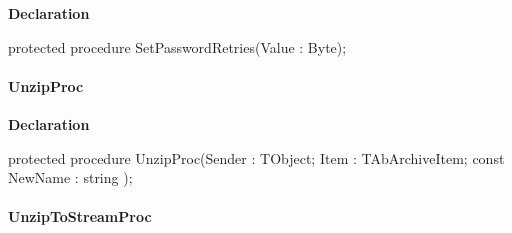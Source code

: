 \documentclass{report}
\newif\ifpdf
\begin{document}
\label{AbUnzper.TAbCustomUnZipper-SetPasswordRetries}
\begin{list}{}{
\setlength{\itemindent}{0cm}
\setlength{\listparindent}{0cm}
\setlength{\leftmargin}{\evensidemargin}
\addtolength{\leftmargin}{\tmplength}
\settowidth{\labelsep}{X}
\addtolength{\leftmargin}{\labelsep}
\setlength{\labelwidth}{\tmplength}
}
\item[\textbf{Declaration}\hfill]
\ifpdf
\begin{flushleft}
\fi
\begin{ttfamily}
protected procedure SetPasswordRetries(Value : Byte);\end{ttfamily}

\ifpdf
\end{flushleft}
\fi

\end{list}
\paragraph*{UnzipProc}\hspace*{\fill}

\label{AbUnzper.TAbCustomUnZipper-UnzipProc}
\begin{list}{}{
\setlength{\itemindent}{0cm}
\setlength{\listparindent}{0cm}
\setlength{\leftmargin}{\evensidemargin}
\addtolength{\leftmargin}{\tmplength}
\settowidth{\labelsep}{X}
\addtolength{\leftmargin}{\labelsep}
\setlength{\labelwidth}{\tmplength}
}
\item[\textbf{Declaration}\hfill]
\ifpdf
\begin{flushleft}
\fi
\begin{ttfamily}
protected procedure UnzipProc(Sender : TObject; Item : TAbArchiveItem; const NewName : string );\end{ttfamily}

\ifpdf
\end{flushleft}
\fi

\end{list}
\paragraph*{UnzipToStreamProc}\hspace*{\fill}
\end{document}
